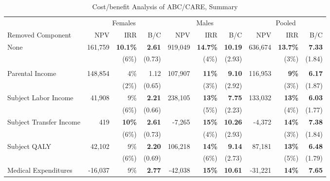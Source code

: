 \documentclass[static]{JJH-Beamer}
\newcommand{\mc}{\multicolumn}
\begin{document}
\begin{frame}[shrink=10]

\begin{table}[H]
\caption{Cost/benefit Analysis of ABC/CARE, Summary}\label{table:cba}
\begin{center}
\begin{tabular}{l r r r r r r r r r}																			
\toprule																			
&       \mc{3}{c}{Females}      &       \mc{3}{c}{Males}        &       \mc{3}{c}{Pooled}       \\																			
\cmidrule(lr){2-4}      \cmidrule(lr){5-7}      \cmidrule(lr){8-10}																			
Removed Component       &       NPV     &       IRR     &       B/C     &       NPV     &       IRR     &       B/C     &       NPV     &       IRR     &       B/C     \\																			
\midrule																			
None	&	161,759	&	\textbf{10.1\%}	&	\textbf{2.61}	&	919,049	&	\textbf{14.7\%}	&	\textbf{10.19}	&	636,674	&	\textbf{13.7\%}	&	\textbf{7.33}	\\
	&		&	(6\%)	&	(0.73)	&		&	(4\%)	&	(2.93)	&		&	(3\%)	&	(1.84)	\\ \\
Parental Income	&	148,854	&	4\%	&	1.12	&	107,907	&	\textbf{11\%}	&	\textbf{9.10}	&	116,953	&	\textbf{9\%}	&	\textbf{6.17}	\\
	&		&	(2\%)	&	(0.65)	&		&	(3\%)	&	(2.92)	&		&	(3\%)	&	(1.87)	\\
Subject Labor Income	&	41,908	&	9\%	&	\textbf{2.21}	&	238,105	&	\textbf{13\%}	&	\textbf{7.75}	&	133,032	&	\textbf{13\%}	&	\textbf{6.03}	\\
	&		&	(6\%)	&	(0.66)	&		&	(5\%)	&	(2.23)	&		&	(4\%)	&	(1.77)	\\
Subject Transfer Income	&	419	&	\textbf{10\%}	&	\textbf{2.61}	&	-7,265	&	\textbf{15\%}	&	\textbf{10.26}	&	-4,372	&	\textbf{14\%}	&	\textbf{7.38}	\\
	&		&	(6\%)	&	(0.73)	&		&	(4\%)	&	(2.93)	&		&	(3\%)	&	(1.84)	\\
Subject QALY	&	42,102	&	9\%	&	\textbf{2.20}	&	106,218	&	\textbf{14\%}	&	\textbf{9.14}	&	87,181	&	\textbf{13\%}	&	\textbf{6.48}	\\
	&		&	(6\%)	&	(0.69)	&		&	(6\%)	&	(2.73)	&		&	(5\%)	&	(1.79)	\\
Medical Expenditures	&	-16,037	&	9\%	&	\textbf{2.77}	&	-42,038	&	\textbf{15\%}	&	\textbf{10.61}	&	-31,221	&	\textbf{14\%}	&	\textbf{7.65}	\\

\end{tabular}
\end{center}
\end{table}
\end{frame}
\end{document}
